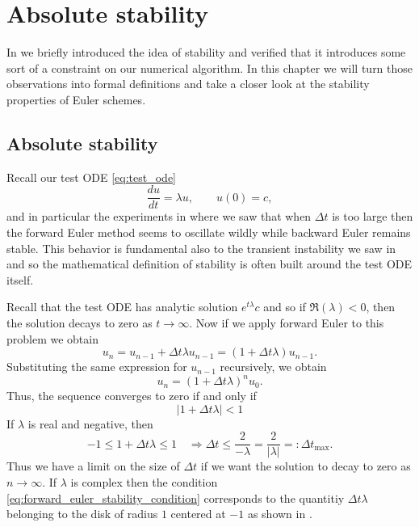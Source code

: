 \chapter{Absolute stability}

In  
we briefly introduced the idea of stability 
and verified that it introduces some sort of a constraint 
on our numerical algorithm. In this chapter we will turn 
those observations into formal definitions and take a closer 
look at the stability properties of Euler schemes.

\section{Absolute stability}

Recall our test ODE \eqref{eq:test_ode} 
\begin{equation*}
    \frac{d u}{d t} = \lambda u, \qquad u(0) = c,
\end{equation*}
and in particular the experiments in 
where we 
saw that when $\Delta t$ is too large then the forward Euler method 
seems to oscillate wildly while backward Euler remains stable. 
This behavior is fundamental also to the transient 
instability we saw in 
and so the mathematical definition of stability is 
often built around the test ODE itself. 

Recall that the test ODE has analytic solution $e^{t \lambda} c$ and so 
if $\Re(\lambda) < 0$, then the solution decays to zero as $t \to \infty$.
Now if we apply forward Euler to this problem we obtain 
\begin{equation*}
    u_{n} = u_{n-1} + \Delta t \lambda u_{n-1} = (1 + \Delta t \lambda) u_{n-1}.
\end{equation*}
Substituting the same expression for $u_{n-1}$ recursively, we obtain 
\begin{equation*}
    u_n = ( 1+ \Delta t \lambda)^n u_0.
\end{equation*}
Thus, the sequence converges to zero if and only if 
\begin{equation}\label{eq:forward_euler_stability_condition}
 |1 + \Delta t \lambda| < 1   
\end{equation}
 If $\lambda$ is real and negative, then 
\begin{equation*}
    -1 \le 1 + \Delta t \lambda \le 1 \quad \Rightarrow \Delta t \le  
    \frac{2}{-\lambda} 
    = \frac{2}{|\lambda|} =: \Delta t_{\max}.
\end{equation*} 
Thus we have a limit on the size of $\Delta t$ if we want the 
solution to decay to zero as $n \to \infty$. If $\lambda$ is complex then 
the condition \eqref{eq:forward_euler_stability_condition} corresponds
to the quantitiy $\Delta t \lambda$ belonging  
to the disk of radius $1$ centered at $-1$ as shown in 
.

